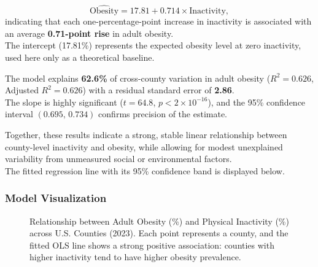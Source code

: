 \documentclass[
  letterpaper,
  DIV=11,
  numbers=noendperiod]{scrartcl}
\begin{document}
\[
\widehat{\text{Obesity}} = 17.81 + 0.714 \times \text{Inactivity},
\] indicating that each one-percentage-point increase in inactivity is
associated with an average \textbf{0.71-point rise} in adult obesity.\\
The intercept (17.81\%) represents the expected obesity level at zero
inactivity, used here only as a theoretical baseline.

The model explains \textbf{62.6\%} of cross-county variation in adult
obesity (\(R^{2}=0.626\), Adjusted \(R^{2}=0.626\)) with a residual
standard error of \textbf{2.86}.\\
The slope is highly significant (\(t=64.8\), \(p<2\times10^{-16}\)), and
the 95\% confidence interval \((0.695,\,0.734)\) confirms precision of
the estimate.

Together, these results indicate a strong, stable linear relationship
between county-level inactivity and obesity, while allowing for modest
unexplained variability from unmeasured social or environmental
factors.\\
The fitted regression line with its 95\% confidence band is displayed
below.

\subsubsection{Model Visualization}\label{model-visualization}

\begin{figure}


\caption{\label{fig-county-scatter}Relationship between Adult Obesity
(\%) and Physical Inactivity (\%) across U.S. Counties (2023). Each
point represents a county, and the fitted OLS line shows a strong
positive association: counties with higher inactivity tend to have
higher obesity prevalence.}

\end{figure}%
\end{document}
